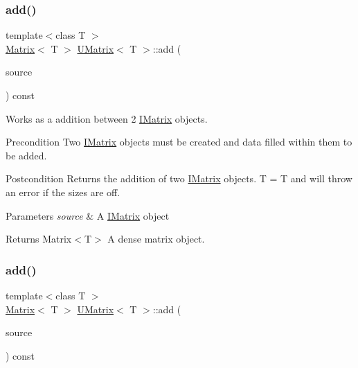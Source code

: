 \subsubsection{\texorpdfstring{add()}{add()}\hspace{0.1cm}{\footnotesize\ttfamily [2/6]}}
{\footnotesize\ttfamily template$<$class T $>$ \\
\mbox{\hyperlink{class_matrix}{Matrix}}$<$ T $>$ \mbox{\hyperlink{class_u_matrix}{U\+Matrix}}$<$ T $>$\+::add (\begin{DoxyParamCaption}\item[{const \mbox{\hyperlink{class_i_matrix}{I\+Matrix}}$<$ \mbox{\hyperlink{class_t_matrix}{T\+Matrix}}$<$ T $>$, T $>$ \&}]{source }\end{DoxyParamCaption}) const}



Works as a addition between 2 \mbox{\hyperlink{class_i_matrix}{I\+Matrix}} objects. 

\begin{DoxyPrecond}{Precondition}
Two \mbox{\hyperlink{class_i_matrix}{I\+Matrix}} objects must be created and data filled within them to be added. 
\end{DoxyPrecond}
\begin{DoxyPostcond}{Postcondition}
Returns the addition of two \mbox{\hyperlink{class_i_matrix}{I\+Matrix}} objects. T = T and will throw an error if the sizes are off.
\end{DoxyPostcond}

\begin{DoxyParams}{Parameters}
{\em source} & A \mbox{\hyperlink{class_i_matrix}{I\+Matrix}} object \\
\hline
\end{DoxyParams}
\begin{DoxyReturn}{Returns}
Matrix$<$\+T$>$ A dense matrix object. 
\end{DoxyReturn}
\mbox{\label{class_u_matrix_a61e915c511ccc6f751b65812b4edda68}} 
\subsubsection{\texorpdfstring{add()}{add()}\hspace{0.1cm}{\footnotesize\ttfamily [3/6]}}
{\footnotesize\ttfamily template$<$class T $>$ \\
\mbox{\hyperlink{class_matrix}{Matrix}}$<$ T $>$ \mbox{\hyperlink{class_u_matrix}{U\+Matrix}}$<$ T $>$\+::add (\begin{DoxyParamCaption}\item[{const \mbox{\hyperlink{class_i_matrix}{I\+Matrix}}$<$ \mbox{\hyperlink{class_l_matrix}{L\+Matrix}}$<$ T $>$, T $>$ \&}]{source }\end{DoxyParamCaption}) const}



